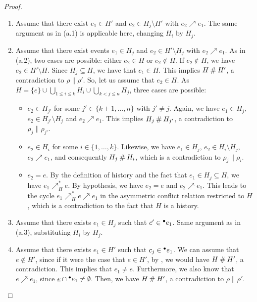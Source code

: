 \documentclass[12pt,a4paper]{article}
\newcommand{\confl}{\ensuremath\mathbin\#}
\begin{document}
\begin{proof}
\begin{enumerate}[(a)]
\begin{enumerate}[1.]
\item Assume that there exist $e_1 \in H'$ and $e_2 \in H_j \setminus H'$ with
$e_2 \nearrow e_1$.  The same argument as in (a.1) is applicable here, changing
$H_i$ by $H_j$.

\item Assume that there exist events $e_1 \in H_j$ and $e_2 \in H' \setminus
H_j$ with $e_2 \nearrow e_1$.  As in (a.2), two cases are possible: either $e_2
\in H$ or $e_2 \notin H$.  If $e_2 \notin H$, we have $e_2 \in H' \setminus H$.
Since $H_j \subseteq H$, we have that $e_1 \in H$.  This implies $H \confl H'$,
a contradiction to $\rho \parallel \rho'$.  So, let us assume that $e_2 \in H$.
As $H = \{e\} \cup \bigcup_{1 \le i \le k} H_i \cup \bigcup_{k < j \le n} H_j$,
three cases are possible:

\begin{itemize}
\item $e_2 \in H_{j'}$ for some $j' \in \{k+1, \ldots, n\}$ with $j' \ne j$.
Again, we have $e_1 \in H_j$, $e_2 \in H_{j'} \setminus H_j$ and $e_2 \nearrow
e_1$.  This implies $H_j \confl H_{j'}$, a contradiction to $\rho_j \parallel
\rho_{j'}$.

\item $e_2 \in H_i$ for some $i \in \{1, \ldots, k\}$.  Likewise, we have $e_1
\in H_j$, $e_2 \in H_i \setminus H_j$, $e_2 \nearrow e_1$, and consequently
$H_j \confl H_i$, which is a contradiction to $\rho_j \parallel \rho_i$.

\item $e_2 = e$.  By the definition of history and the fact that $e_1 \in H_j
\subseteq H$, we have $e_1 \nearrow^*_H e$.  By hypothesis, we have $e_2 = e$
and $e_2 \nearrow e_1$.  This leads to the cycle $e_1 \nearrow^*_H e \nearrow
e_1$ in the asymmetric conflict relation restricted to $H$, which is a
contradiction to the fact that $H$ is a history.
\end{itemize}

\item Assume that there exists $e_1 \in H_j$ such that $c' \in {}^\bullet e_1$.
Same argument as in (a.3), substituting $H_i$ by $H_j$.

\item Assume that there exists $e_1 \in H'$ such that $c_j \in {}^\bullet e_1$. We
can assume that $e \notin H'$, since if it were the case that $e \in H'$, by
, we would have $H \confl H'$, a contradiction.  This
implies that $e_1 \ne e$.  Furthermore, we also know that $e \nearrow e_1$,
since $\underline{e} \cap {}^\bullet e_1 \ne \emptyset$.  Then, we have $H \confl H'$, a
contradiction to $\rho \parallel \rho'$.
\end{enumerate}


\end{enumerate}
\end{proof}
\end{document}
